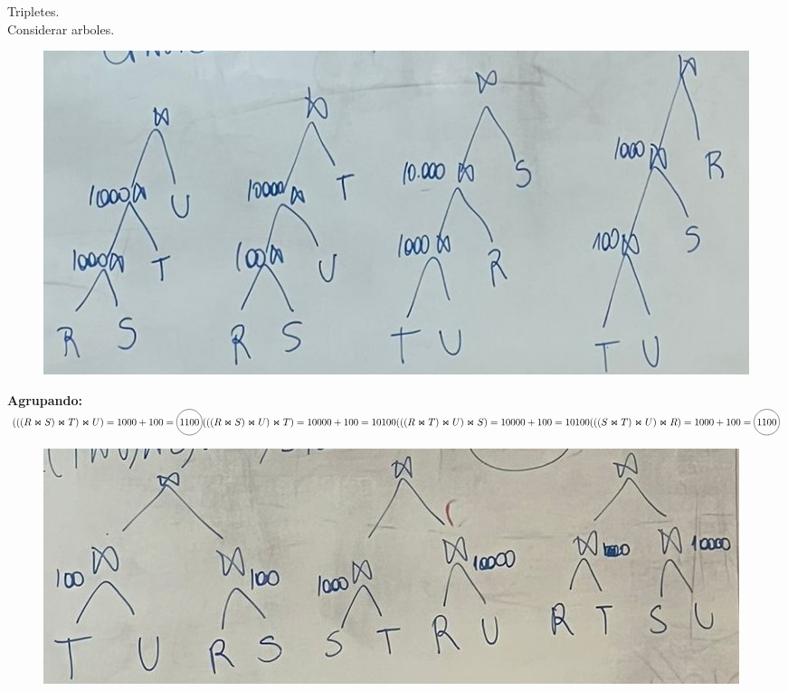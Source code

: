 \documentclass{templateNote}
\begin{document}
\begin{enumerate}
\begin{enumerate}[label=\alph*)]
\begin{enumerate}[label=\alph*)]
                \vspace{0.5cm}
                \noindent Tripletes. \\Considerar arboles. \\

                \begin{figure}[H]
                    \centering
                    \includegraphics[width=\textwidth]{img/Imagen de WhatsApp 2024-07-08 a las 15.29.31_93439903.jpg}
                \end{figure}
                
                \noindent \textbf{Agrupando:} \\
                \begin{math}
                    (((R \Join S ) \Join T ) \Join U) = 1000 + 100 = \tikz[baseline=(char.base)]{\node[shape=circle,draw,inner sep=2pt] (char) {$1100$};} \\
                    (((R \Join S ) \Join U ) \Join T) = 10000 + 100 = 10100 \\
                    (((R \Join T ) \Join U ) \Join S) = 10000 + 100 = 10100 \\
                    (((S \Join T ) \Join U ) \Join R) = 1000 + 100 = \tikz[baseline=(char.base)]{\node[shape=circle,draw,inner sep=2pt] (char) {$1100$};} \\
                \end{math}

                \begin{figure}[H]
                    \centering
                    \includegraphics[width=\textwidth]{img/Imagen de WhatsApp 2024-07-08 a las 15.29.32_c3dfc849.jpg}
                \end{figure}


\end{enumerate}
\end{enumerate}
\end{enumerate}
\end{document}
